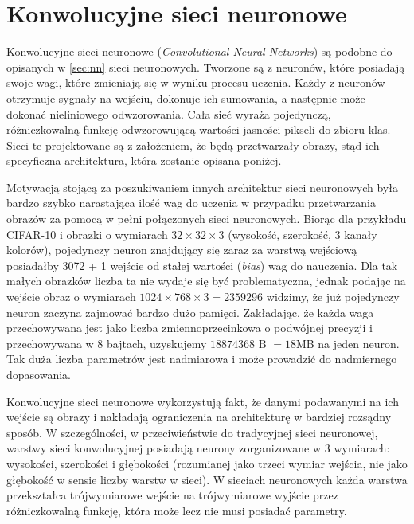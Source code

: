 \section{Konwolucyjne sieci neuronowe}\label{sec:cnn}

Konwolucyjne sieci neuronowe (\textit{Convolutional Neural Networks}) są podobne do opisanych w \ref{sec:nn} sieci neuronowych.
Tworzone są z neuronów, które posiadają swoje wagi, które zmieniają się w wyniku procesu uczenia.
Każdy z neuronów otrzymuje sygnały na wejściu, dokonuje ich sumowania, a następnie może dokonać nieliniowego odwzorowania.
Cała sieć wyraża pojedynczą, różniczkowalną funkcję odwzorowującą wartości jasności pikseli do zbioru klas.
Sieci te projektowane są z założeniem, że będą przetwarzały obrazy, stąd ich specyficzna architektura, która zostanie opisana poniżej.

Motywacją stojącą za poszukiwaniem innych architektur sieci neuronowych była bardzo szybko narastająca ilość wag do uczenia w przypadku przetwarzania obrazów za pomocą w pełni połączonych sieci neuronowych.
Biorąc dla przykładu CIFAR-10 i obrazki o wymiarach $ 32 \times 32 \times 3$ (wysokość, szerokość, 3 kanały kolorów), pojedynczy neuron znajdujący się zaraz za warstwą wejściową posiadałby 3072 + 1 wejście od stałej wartości (\textit{bias}) wag do nauczenia.
Dla tak małych obrazków liczba ta nie wydaje się być problematyczna, jednak podając na wejście obraz o wymiarach $1024 \times 768 \times 3 = 2359296$ widzimy, że już pojedynczy neuron zaczyna zajmować bardzo dużo pamięci.
Zakładając, że każda waga przechowywana jest jako liczba zmiennoprzecinkowa o podwójnej precyzji i przechowywana w 8 bajtach, uzyskujemy $18874368$ B $= 18$MB na jeden neuron.
Tak duża liczba parametrów jest nadmiarowa i może prowadzić do nadmiernego dopasowania.

Konwolucyjne sieci neuronowe wykorzystują fakt, że danymi podawanymi na ich wejście są obrazy i nakładają ograniczenia na architekturę w bardziej rozsądny sposób.
W szczególności, w przeciwieństwie do tradycyjnej sieci neuronowej, warstwy sieci konwolucyjnej posiadają neurony zorganizowane w 3 wymiarach: wysokości, szerokości i głębokości (rozumianej jako trzeci wymiar wejścia, nie jako głębokość w sensie liczby warstw w sieci).
W sieciach neuronowych każda warstwa przekształca trójwymiarowe wejście na trójwymiarowe wyjście przez różniczkowalną funkcję, która może lecz nie musi posiadać parametry.


